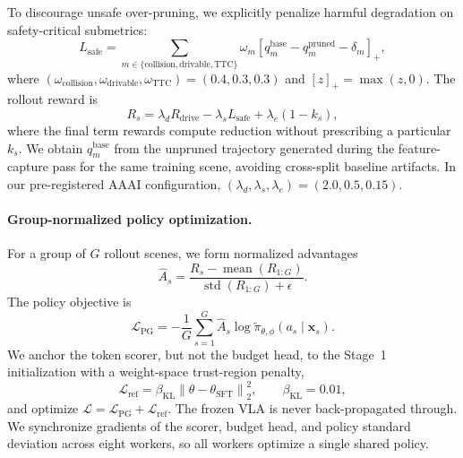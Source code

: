 \documentclass[letterpaper]{article} %
\begin{document}
To discourage unsafe over-pruning, we explicitly penalize harmful degradation on safety-critical submetrics:
\begin{equation}
L_{\mathrm{safe}} = \sum_{m\in\{\mathrm{collision},\mathrm{drivable},\mathrm{TTC}\}}
\omega_m\left[q_m^{\mathrm{base}}-q_m^{\mathrm{pruned}}-\delta_m\right]_+,
\label{eq:safety-loss}
\end{equation}
where $(\omega_{\mathrm{collision}},\omega_{\mathrm{drivable}},\omega_{\mathrm{TTC}})=(0.4,0.3,0.3)$ and $[z]_+=\max(z,0)$. The rollout reward is
\begin{equation}
R_s=\lambda_dR_{\mathrm{drive}}-\lambda_sL_{\mathrm{safe}}
+\lambda_e(1-k_s),
\label{eq:total-reward}
\end{equation}
where the final term rewards compute reduction without prescribing a particular $k_s$. We obtain $q_m^{\mathrm{base}}$ from the unpruned trajectory generated during the feature-capture pass for the same training scene, avoiding cross-split baseline artifacts. In our pre-registered AAAI configuration, $(\lambda_d,\lambda_s,\lambda_e)=(2.0,0.5,0.15)$.

\paragraph{Group-normalized policy optimization.}
For a group of $G$ rollout scenes, we form normalized advantages
\begin{equation}
\widehat{A}_s=\frac{R_s-\operatorname{mean}(R_{1:G})}
{\operatorname{std}(R_{1:G})+\epsilon}.
\end{equation}
The policy objective is
\begin{equation}
\mathcal{L}_{\mathrm{PG}}
=-\frac{1}{G}\sum_{s=1}^{G}\widehat{A}_s
\log\widetilde{\pi}_{\theta,\phi}(a_s\mid\mathbf{x}_s).
\label{eq:pg}
\end{equation}
We anchor the token scorer, but not the budget head, to the Stage~1 initialization with a weight-space trust-region penalty,
\begin{equation}
\mathcal{L}_{\mathrm{ref}}=\beta_{\mathrm{KL}}
\left\|\theta-\theta_{\mathrm{SFT}}\right\|_2^2,
\qquad \beta_{\mathrm{KL}}=0.01,
\end{equation}
and optimize $\mathcal{L}=\mathcal{L}_{\mathrm{PG}}+\mathcal{L}_{\mathrm{ref}}$. The frozen VLA is never back-propagated through. We synchronize gradients of the scorer, budget head, and policy standard deviation across eight workers, so all workers optimize a single shared policy.
\end{document}
